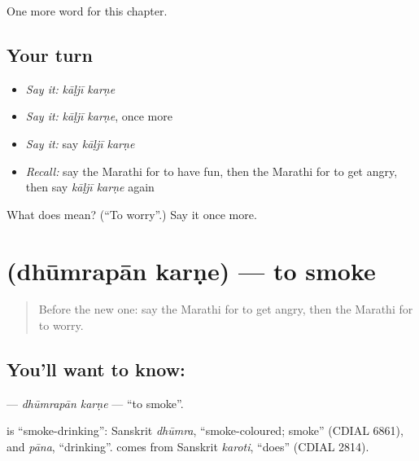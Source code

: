 \begin{grammarlens}[title={What you've built}]
One more word for this chapter.
\end{grammarlens}

\subsection*{Your turn}
\begin{itemize}
\raggedright
  \item \emph{Say it:} \emph{kāḷjī karṇe}
  \item \emph{Say it:} \emph{kāḷjī karṇe}, once more
  \item \emph{Say it:} say \emph{kāḷjī karṇe}
  \item \emph{Recall:} say the Marathi for to have fun, then the Marathi for to get angry, then say \emph{kāḷjī karṇe} again
\end{itemize}

\begin{tcolorbox}[breakable,colback=teal!4,colframe=teal!35!black,title={Before you move on}]
What does   mean? (\textquotedblleft{}To worry\textquotedblright{}.) Say it once more.
\end{tcolorbox}
\section[\texorpdfstring{\mr{धूम्रपान} \mr{करणे} (dhūmrapān karṇe)}{धूम्रपान करणे (dhūmrapān karṇe)}]{  (dhūmrapān karṇe) — to smoke}

\label{lesson:MR-C252-dhumrapan-karne}



\begin{quote}
Before the new one: say the Marathi for to get angry, then the Marathi for to worry.
\end{quote}

\subsection*{You'll want to know:  }
\textbf{ } — \emph{dhūmrapān karṇe} — \textquotedblleft{}to smoke\textquotedblright{}.

\begin{cousinweb}
\textbf{} is \textquotedblleft{}smoke-drinking\textquotedblright{}: Sanskrit \emph{dhūmra}, \textquotedblleft{}smoke-coloured; smoke\textquotedblright{} (CDIAL 6861), and \emph{pāna}, \textquotedblleft{}drinking\textquotedblright{}. \textbf{} comes from Sanskrit \emph{karoti}, \textquotedblleft{}does\textquotedblright{} (CDIAL 2814).
\end{cousinweb}

